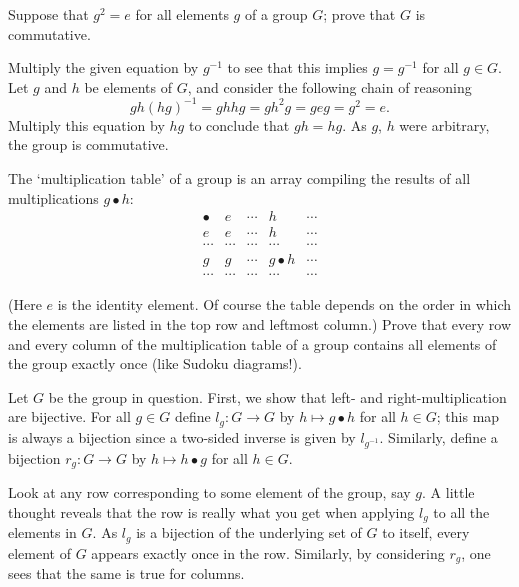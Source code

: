 \begin{exercise}
	Suppose that $g^2 = e$ for all elements $g$ of a group $G$; prove that $G$ is commutative.
\end{exercise}
\begin{solution}
	Multiply the given equation by $g^{-1}$ to see that this implies $g = g^{-1}$ for all $g\in G$. Let $g$ and $h$ be elements of $G$, and consider the following chain of reasoning
	\[
		gh(hg)^{-1} = ghhg= gh^2g = geg = g^2 = e.
	\]
	Multiply this equation by $hg$ to conclude that $gh=hg$. As $g$, $h$ were arbitrary, the group is commutative.
\end{solution}

\begin{exercise}
	The `multiplication table' of a group is an array compiling the results of all multiplications $g\bullet h$:
	{%
	\renewcommand{\arraystretch}{1.5}
	\[
		\begin{array}{c||c|c|c|c}
			\bullet & e & \cdots & h & \cdots\\
			\hline
			\hline
			e & e & \cdots & h & \cdots \\
			\hline
			\cdots & \cdots & \cdots & \cdots & \cdots \\
			\hline
			g & g & \cdots & g\bullet h & \cdots \\
			\hline
			\cdots & \cdots & \cdots & \cdots & \cdots 
		\end{array}
	\]
	}

	(Here $e$ is the identity element. Of course the table depends on the order in which the elements are listed in the top row and leftmost column.) Prove that every row and every column of the multiplication table of a group contains all elements of the group exactly once (like Sudoku diagrams!).
\end{exercise}
\begin{solution}
	Let $G$ be the group in question. First, we show that left- and right-multiplication are bijective. For all $g\in G$ define $l_g\colon G\to G$ by $h\mapsto g\bullet h$ for all $h\in G$; this map is always a bijection since a two-sided inverse is given by $l_{g^{-1}}$. Similarly, define a bijection $r_g\colon G \to G$ by $h\mapsto h\bullet g$ for all $h\in G$.
	
	Look at any row corresponding to some element of the group, say $g$. A little thought reveals that the row is really what you get when applying $l_g$ to all the elements in $G$. As $l_g$ is a bijection of the underlying set of $G$ to itself, every element of $G$ appears exactly once in the row. Similarly, by considering $r_g$, one sees that the same is true for columns.
\end{solution}

